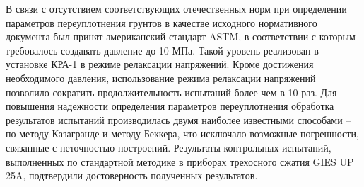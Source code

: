 В связи с отсутствием соответствующих отечественных норм при определении параметров переуплотнения грунтов в качестве исходного нормативного документа был принят американский стандарт ASTM, в соответствии с которым требовалось создавать давление до 10 МПа. Такой уровень реализован в установке КРА-1 в режиме релаксации напряжений. Кроме достижения необходимого давления, использование режима релаксации напряжений позволило сократить продолжительность испытаний более чем в 10 раз. 
Для повышения надежности определения параметров переуплотнения обработка результатов испытаний производилась двумя наиболее известными способами – по методу Казагранде и методу Беккера, что исключало возможные погрешности, связанные с неточностью построений. Результаты контрольных испытаний, выполненных по стандартной методике в приборах трехосного сжатия GIES UP 25A, подтвердили достоверность полученных результатов.
